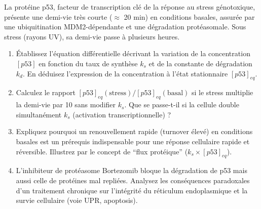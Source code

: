 \documentclass[11pt]{article}
\begin{document}
\begin{exercice}
La protéine p53, facteur de transcription clé de la réponse au stress génotoxique, présente une demi-vie très courte ($\approx$ 20 min) en conditions basales, assurée par une ubiquitination MDM2-dépendante et une dégradation protéasomale. Sous stress (rayons UV), sa demi-vie passe à plusieurs heures.

\begin{enumerate}
\item Établissez l'équation différentielle décrivant la variation de la concentration $[p53]$ en fonction du taux de synthèse $k_s$ et de la constante de dégradation $k_d$. En déduisez l'expression de la concentration à l'état stationnaire $[p53]_{eq}$.
\item Calculez le rapport $[p53]_{eq}(\text{stress}) / [p53]_{eq}(\text{basal})$ si le stress multiplie la demi-vie par 10 sans modifier $k_s$. Que se passe-t-il si la cellule double simultanément $k_s$ (activation transcriptionnelle) ?
\item Expliquez pourquoi un renouvellement rapide (turnover élevé) en conditions basales est un prérequis indispensable pour une réponse cellulaire rapide et réversible. Illustrez par le concept de ``flux protéique'' ($k_s \times [p53]_{eq}$).
\item L'inhibiteur de protéasome Bortezomib bloque la dégradation de p53 mais aussi celle de protéines mal repliées. Analysez les conséquences paradoxales d'un traitement chronique sur l'intégrité du réticulum endoplasmique et la survie cellulaire (voie UPR, apoptosis).
\end{enumerate}
\end{exercice}
\end{document}
